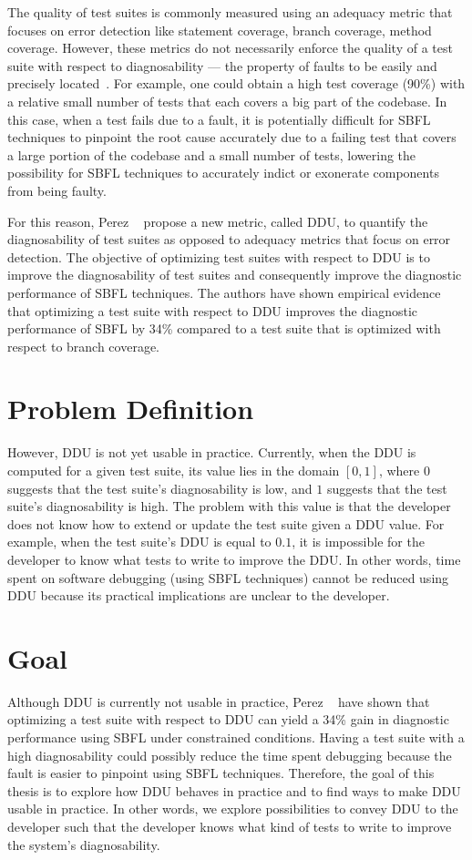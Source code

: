 \documentclass[twoside,a4paper,11pt]{memoir}
\begin{document}
The quality of test suites is commonly measured using an adequacy metric that focuses on error detection like statement coverage, branch coverage, method coverage.
However, these metrics do not necessarily enforce the quality of a test suite with respect to diagnosability --- the property of faults to be easily and precisely located~\cite{730889}.
For example, one could obtain a high test coverage (90\%) with a relative small number of tests that each covers a big part of the codebase.
In this case, when a test fails due to a fault, it is potentially difficult for SBFL techniques to pinpoint the root cause accurately due to a failing test that covers a large portion of the codebase and a small number of tests, lowering the possibility for SBFL techniques to accurately indict or exonerate components from being faulty.

For this reason, Perez \etal~\cite{DBLP:conf/icse/PerezAD17} propose a new metric, called DDU, to quantify the diagnosability of test suites as opposed to adequacy metrics that focus on error detection.
The objective of optimizing test suites with respect to DDU is to improve the diagnosability of test suites and consequently improve the diagnostic performance of SBFL techniques.
The authors have shown empirical evidence that optimizing a test suite with respect to DDU improves the diagnostic performance of SBFL by 34\% compared to a test suite that is optimized with respect to branch coverage.

\section{Problem Definition}%
\label{sec:problem_definition}
However, DDU is not yet usable in practice.
Currently, when the DDU is computed for a given test suite, its value lies in the domain \([ 0, 1 ]\), where \(0\) suggests that the test suite's diagnosability is low, and \(1\) suggests that the test suite's diagnosability is high.
The problem with this value is that the developer does not know how to extend or update the test suite given a DDU value.
For example, when the test suite's DDU is equal to \(0.1\), it is impossible for the developer to know what tests to write to improve the DDU\@.
In other words, time spent on software debugging (using SBFL techniques) cannot be reduced using DDU because its practical implications are unclear to the developer.

\section{Goal}
Although DDU is currently not usable in practice, Perez \etal~\cite{DBLP:conf/icse/PerezAD17} have shown that optimizing a test suite with respect to DDU can yield a 34\% gain in diagnostic performance using SBFL under constrained conditions\@.
Having a test suite with a high diagnosability could possibly reduce the time spent debugging because the fault is easier to pinpoint using SBFL techniques.
Therefore, the goal of this thesis is to explore how DDU behaves in practice and to find ways to make DDU usable in practice.
In other words, we explore possibilities to convey DDU to the developer such that the developer knows what kind of tests to write to improve the system's diagnosability.
\end{document}
